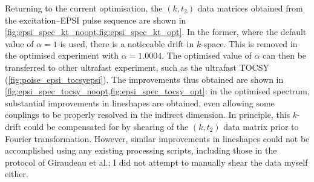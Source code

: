 Returning to the current optimisation, the $(k, t_2)$ data matrices obtained from the excitation--EPSI pulse sequence are shown in \cref{fig:epsi_spec_kt_noopt,fig:epsi_spec_kt_opt}.
In the former, where the default value of $\alpha = 1$ is used, there is a noticeable drift in $k$-space.
This is removed in the optimised experiment with $\alpha = 1.0004$.
The optimised value of $\alpha$ can then be transferred to other ultrafast experiment, such as the ultrafast TOCSY (\cref{fig:poise_epsi_tocsyepsi}).
The improvements thus obtained are shown in \cref{fig:epsi_spec_tocsy_noopt,fig:epsi_spec_tocsy_opt}: in the optimised spectrum, substantial improvements in lineshapes are obtained, even allowing some couplings to be properly resolved in the indirect dimension.
In principle, this $k$-drift could be compensated for by shearing of the $(k, t_2)$ data matrix prior to Fourier transformation.
However, similar improvements in lineshapes could not be accomplished using any existing processing scripts, including those in the protocol of Giraudeau et al.\autocite{Gouilleux2018ARNMRS}; I did not attempt to manually shear the data myself either.
